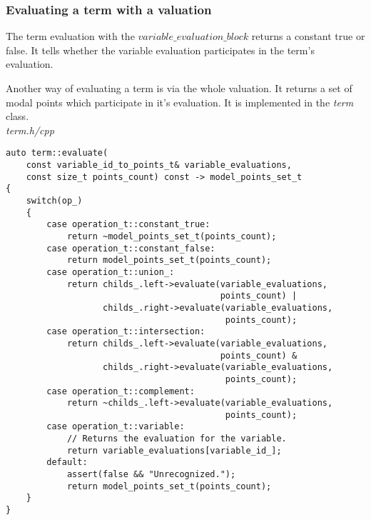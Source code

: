 \documentclass{article}
\begin{document}
	\newpage
	\subsubsection*{Evaluating a term with a valuation}
	The term evaluation with the $variable\_evaluation\_block$ returns a constant true or false. It tells whether the variable evaluation participates in the term's evaluation.

	Another way of evaluating a term is via the whole valuation. It returns a set of modal points which participate in it's evaluation. It is implemented in the \textit{term} class.
\\
\noindent
\textit{term.h/cpp}
\begin{lstlisting}
auto term::evaluate(
	const variable_id_to_points_t& variable_evaluations,
	const size_t points_count) const -> model_points_set_t
{
    switch(op_)
    {
        case operation_t::constant_true:
            return ~model_points_set_t(points_count);
        case operation_t::constant_false:
            return model_points_set_t(points_count);
        case operation_t::union_:
            return childs_.left->evaluate(variable_evaluations,
                                          points_count) |
                   childs_.right->evaluate(variable_evaluations,
                                           points_count);
        case operation_t::intersection:
            return childs_.left->evaluate(variable_evaluations,
                                          points_count) &
                   childs_.right->evaluate(variable_evaluations,
                                           points_count);
        case operation_t::complement:
            return ~childs_.left->evaluate(variable_evaluations,
                                           points_count);
        case operation_t::variable:
            // Returns the evaluation for the variable.
            return variable_evaluations[variable_id_];
        default:
            assert(false && "Unrecognized.");
            return model_points_set_t(points_count);
    }
}
\end{lstlisting}

	\newpage
\end{document}
